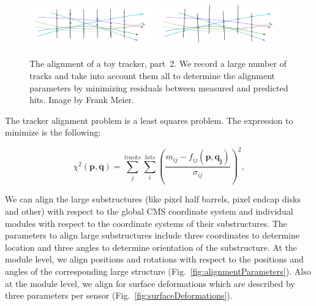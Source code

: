 \begin{figure}[htb]
    \begin{center}
        \includegraphics[width=0.48\textwidth]{../figs/Alignment/toyTracker12.png}
        \includegraphics[width=0.48\textwidth]{../figs/Alignment/toyTracker13.png}
    \end{center}
    \caption{The alignment of a toy tracker, part~2. We record a large number of tracks and take into account them all to determine the alignment parameters by minimizing residuals between measured and predicted hits. Image by Frank Meier.}
    \label{fig:toyTracker_part2}
\end{figure}


The tracker alignment problem is a least squares problem. The expression to minimize is the following:

\begin{equation}
  \chi^2(\mathbf{p},\mathbf{q})=\sum_j^{tracks} \sum_i^{hits} \left( {\frac{m_{ij}-f_{ij}(\mathbf{p},\mathbf{q_j})}{\sigma_{ij}}} \right)^2,
\end{equation}


We can align the large substructures (like pixel half barrels, pixel endcap disks and other) with respect to the global CMS coordinate system and individual modules with respect to the coordinate systems of their substructures. The parameters to align large substructures include three coordinates to determine location and three angles to determine orientation of the substructure. At the module level, we align positions and rotations with respect to the positions and angles of the corresponding large structure (Fig.~\ref{fig:alignmentParameters}). Also at the module level, we align for surface deformations which are described by three parameters per sensor (Fig.~\ref{fig:surfaceDeformations}). 

